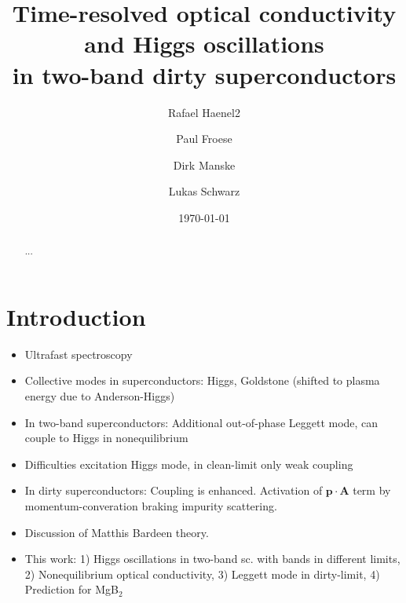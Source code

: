 \documentclass[aps,prb,reprint,noeprint,superscriptaddress]{revtex4-1}
\begin{document}
\title{Time-resolved optical conductivity and Higgs oscillations\\in two-band dirty superconductors}

\author{Rafael Haenel2}

\author{Paul Froese}


\author{Dirk Manske}

\author{Lukas Schwarz}


\date{\today}

\begin{abstract}
...
\end{abstract}




\maketitle


\section{Introduction}
\label{sec:introduction}

\begin{itemize}
	\item Ultrafast spectroscopy
	\item Collective modes in superconductors: Higgs, Goldstone (shifted to plasma energy due to Anderson-Higgs)
	\item In two-band superconductors: Additional out-of-phase Leggett mode, can couple to Higgs in nonequilibrium
	\item Difficulties excitation Higgs mode, in clean-limit only weak coupling
	\item In dirty superconductors: Coupling is enhanced. Activation of
		$\mathbf{p} \cdot \mathbf{A}$ term by momentum-converation
		braking impurity scattering.
	\item Discussion of Matthis Bardeen theory.
	\item This work: 1) Higgs oscillations in two-band sc. with bands in different limits, 2) Nonequilibrium optical conductivity, 3) Leggett mode in dirty-limit, 4) Prediction for MgB$_2$
\end{itemize}
\end{document}

